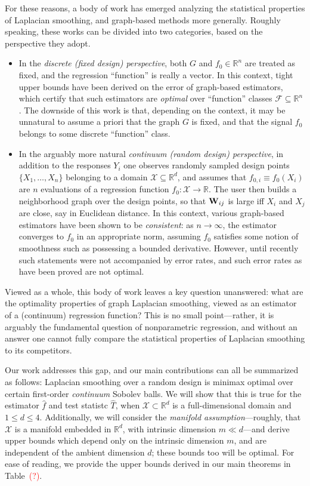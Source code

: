 \documentclass[twoside]{article}
\newcommand{\Reals}{\mathbb{R}}
\newcommand{\1}{\mathbf{1}}
\newcommand{\Rd}{\Reals^d}
\newcommand{\Xset}{\mathcal{X}}
\newcommand{\mc}[1]{\mathcal{#1}}
\newcommand{\wh}[1]{\widehat{#1}}
\theoremstyle{definition}
\theoremstyle{remark}
\begin{document}
For these reasons, a body of work has emerged analyzing the statistical properties of Laplacian smoothing, and graph-based methods more generally. Roughly speaking, these works can be divided into two categories, based on the perspective they adopt. 
\begin{itemize}
	\item In the \emph{discrete (fixed design) perspective}, both $G$ and $f_0 \in \Reals^n$ are treated as fixed, and the regression ``function'' is really a vector. In this context, tight upper bounds have been derived on the error of graph-based estimators, which certify that such estimators are \emph{optimal} over ``function'' classes $\mc{F} \subseteq \Reals^n$. The downside of this work is that, depending on the context, it may be unnatural to assume a priori that the graph $G$ is fixed, and that the signal $f_0$ belongs to some discrete ``function'' class.
	\item In the arguably more natural \emph{continuum (random design) perspective}, in addition to the responses $Y_i$ one observes randomly sampled design points $\{X_1,\ldots,X_n\}$ belonging to a domain $\Xset \subseteq \Rd$, and assumes that $f_{0,i} \equiv f_0(X_i)$ are $n$ evaluations of a regression function $f_0: \Xset \to \Reals$. The user then builds a neighborhood graph over the design points, so that ${\bf W}_{ij}$ is large iff $X_i$ and $X_j$ are close, say in Euclidean distance. In this context, various graph-based estimators have been shown to be \emph{consistent}: as $n \to \infty$, the estimator converges to $f_0$ in an appropriate norm, assuming $f_0$ satisfies some notion of smoothness such as possessing a bounded derivative. However, until recently such statements were not accompanied by error rates, and such error rates as have been proved are not optimal.
\end{itemize}
Viewed as a whole, this body of work leaves a key question unanswered: what are the optimality properties of graph Laplacian smoothing, viewed as an estimator of a (continuum) regression function? This is no small point---rather, it is arguably the fundamental question of nonparametric regression, and without an answer one cannot fully compare the statistical properties of Laplacian smoothing to its competitors.

Our work addresses this gap, and our main contributions can all be summarized as follows: Laplacian smoothing over a random design is minimax optimal over certain first-order \emph{continuum} Sobolev balls. We will show that this is true for the estimator $\wh{f}$ and test statistc $\wh{T}$, when $\Xset \subset \Rd$ is a full-dimensional domain and $1 \leq d \leq 4$. Additionally, we will consider the \emph{manifold assumption}---roughly, that $\Xset$ is a manifold embedded in $\Rd$, with intrinsic dimension $m \ll d$---and derive upper bounds which depend only on the intrinsic dimension $m$, and are independent of the ambient dimension $d$; these bounds too will be optimal. For ease of reading, we provide the upper bounds derived in our main theorems in Table~\textcolor{red}{(?)}. 
\end{document}

